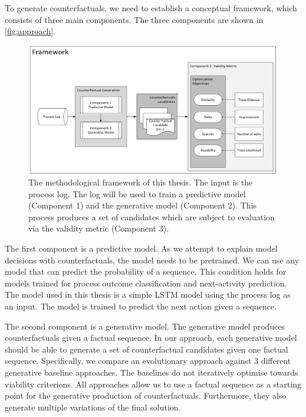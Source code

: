 \documentclass[./../../paper.tex]{subfiles}
\begin{document}
To generate counterfactuals, we need to establish a conceptual framework, which consists of three main components. The three components are shown in \autoref{fig:approach}. 

\begin{figure}[htb]
    \centering
    \includegraphics[width=0.99\textwidth]{figures/framework.png}
    \caption{The methodological framework of this thesis. The input is the process log. The log will be used to train a predictive model (Component 1) and the generative model (Component 2). This process produces a set of candidates which are subject to evaluation via the validity metric (Component 3).}
    \label{fig:approach}
\end{figure}

The first component is a predictive model. As we attempt to explain model decisions with counterfactuals, the model needs to be pretrained. We can use any model that can predict the probability of a sequence. This condition holds for models trained for process outcome classification and next-activity prediction. The model used in this thesis is a simple LSTM model using the process log as an input. The model is trained to predict the next action given a sequence. 

The second component is a generative model. The generative model produces counterfactuals given a factual sequence. In our approach, each generative model should be able to generate a set of counterfactual candidates given one factual sequence. Specifically, we compare an evolutionary approach against 3 different generative baseline approaches. The baselines do not iteratively optimise towards viability criterions. All approaches allow us to use a factual sequence as a starting point for the generative production of counterfactuals. Furthermore, they also generate multiple variations of the final solution. 
\end{document}
